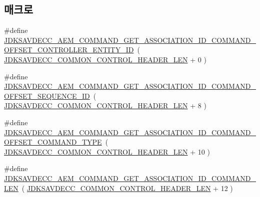 \subsection*{매크로}
\begin{DoxyCompactItemize}
\item 
\#define \hyperlink{group__command__get__association__id_ga4cc6079cc30c7fdf0cc7d6189384327d}{J\+D\+K\+S\+A\+V\+D\+E\+C\+C\+\_\+\+A\+E\+M\+\_\+\+C\+O\+M\+M\+A\+N\+D\+\_\+\+G\+E\+T\+\_\+\+A\+S\+S\+O\+C\+I\+A\+T\+I\+O\+N\+\_\+\+I\+D\+\_\+\+C\+O\+M\+M\+A\+N\+D\+\_\+\+O\+F\+F\+S\+E\+T\+\_\+\+C\+O\+N\+T\+R\+O\+L\+L\+E\+R\+\_\+\+E\+N\+T\+I\+T\+Y\+\_\+\+ID}~( \hyperlink{group__jdksavdecc__avtp__common__control__header_gaae84052886fb1bb42f3bc5f85b741dff}{J\+D\+K\+S\+A\+V\+D\+E\+C\+C\+\_\+\+C\+O\+M\+M\+O\+N\+\_\+\+C\+O\+N\+T\+R\+O\+L\+\_\+\+H\+E\+A\+D\+E\+R\+\_\+\+L\+EN} + 0 )
\item 
\#define \hyperlink{group__command__get__association__id_ga56cc00f4851809a46a6a639c6a8180b4}{J\+D\+K\+S\+A\+V\+D\+E\+C\+C\+\_\+\+A\+E\+M\+\_\+\+C\+O\+M\+M\+A\+N\+D\+\_\+\+G\+E\+T\+\_\+\+A\+S\+S\+O\+C\+I\+A\+T\+I\+O\+N\+\_\+\+I\+D\+\_\+\+C\+O\+M\+M\+A\+N\+D\+\_\+\+O\+F\+F\+S\+E\+T\+\_\+\+S\+E\+Q\+U\+E\+N\+C\+E\+\_\+\+ID}~( \hyperlink{group__jdksavdecc__avtp__common__control__header_gaae84052886fb1bb42f3bc5f85b741dff}{J\+D\+K\+S\+A\+V\+D\+E\+C\+C\+\_\+\+C\+O\+M\+M\+O\+N\+\_\+\+C\+O\+N\+T\+R\+O\+L\+\_\+\+H\+E\+A\+D\+E\+R\+\_\+\+L\+EN} + 8 )
\item 
\#define \hyperlink{group__command__get__association__id_ga64b5ac33f28b0fe0859809512e0e3512}{J\+D\+K\+S\+A\+V\+D\+E\+C\+C\+\_\+\+A\+E\+M\+\_\+\+C\+O\+M\+M\+A\+N\+D\+\_\+\+G\+E\+T\+\_\+\+A\+S\+S\+O\+C\+I\+A\+T\+I\+O\+N\+\_\+\+I\+D\+\_\+\+C\+O\+M\+M\+A\+N\+D\+\_\+\+O\+F\+F\+S\+E\+T\+\_\+\+C\+O\+M\+M\+A\+N\+D\+\_\+\+T\+Y\+PE}~( \hyperlink{group__jdksavdecc__avtp__common__control__header_gaae84052886fb1bb42f3bc5f85b741dff}{J\+D\+K\+S\+A\+V\+D\+E\+C\+C\+\_\+\+C\+O\+M\+M\+O\+N\+\_\+\+C\+O\+N\+T\+R\+O\+L\+\_\+\+H\+E\+A\+D\+E\+R\+\_\+\+L\+EN} + 10 )
\item 
\#define \hyperlink{group__command__get__association__id_ga71a17007be8c4f1ce7ac1c9f36a1f77e}{J\+D\+K\+S\+A\+V\+D\+E\+C\+C\+\_\+\+A\+E\+M\+\_\+\+C\+O\+M\+M\+A\+N\+D\+\_\+\+G\+E\+T\+\_\+\+A\+S\+S\+O\+C\+I\+A\+T\+I\+O\+N\+\_\+\+I\+D\+\_\+\+C\+O\+M\+M\+A\+N\+D\+\_\+\+L\+EN}~( \hyperlink{group__jdksavdecc__avtp__common__control__header_gaae84052886fb1bb42f3bc5f85b741dff}{J\+D\+K\+S\+A\+V\+D\+E\+C\+C\+\_\+\+C\+O\+M\+M\+O\+N\+\_\+\+C\+O\+N\+T\+R\+O\+L\+\_\+\+H\+E\+A\+D\+E\+R\+\_\+\+L\+EN} + 12 )
\end{DoxyCompactItemize}
